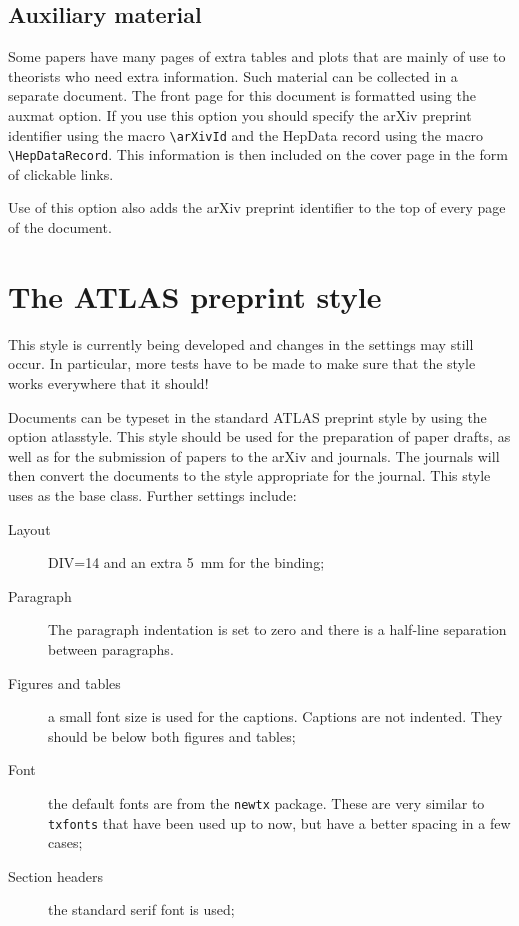 \documentclass[atlasstyle,UKenglish]{latex/atlasdoc}
\newcommand{\Macro}[1]{\texttt{\textbackslash #1}\xspace}
\newcommand{\Option}[1]{\textsf{#1}\xspace}
\newcommand{\Package}[1]{\texttt{#1}\xspace}
\begin{document}
\subsection{Auxiliary material}
\label{sec:auxmat}

Some papers have many pages of extra tables and plots that are mainly of use to theorists
who need extra information.
Such material can be collected in a separate document.
The front page for this document is formatted using the \Option{auxmat} option.
If you use this option you should specify the arXiv preprint identifier
using the macro \Macro{arXivId} and the HepData record using the macro
\Macro{HepDataRecord}.
This information is then included on the cover page in the form of clickable links.

Use of this option also adds the arXiv preprint identifier to the top of every page
of the document.


\section{The ATLAS preprint style}
\label{sec:atlasstyle}

This style is currently being developed and changes in the settings may still occur.
In particular, more tests have to be made to make sure that the style
works everywhere that it should!

Documents can be typeset in the standard ATLAS preprint style by using the option
\Option{atlasstyle}.
This style should be used for the preparation of paper drafts,
as well as for the submission of papers to the arXiv and journals.
The journals will then convert the documents to the style appropriate for the journal.
This style uses \KOMAScript as the base class.
Further settings include:
\begin{description}
\item[Layout] \Option{DIV=14} and an extra \SI{5}{\mm} for the binding;
\item[Paragraph] The paragraph indentation is set to zero and 
  there is a half-line separation between paragraphs.
\item[Figures and tables] a small font size is used for the captions.
  Captions are not indented.
  They should be below both figures and tables;
\item[Font] the default fonts are from the \Package{newtx} package.
  These are very similar to \Package{txfonts} that have been used up to now,
  but have a better spacing in a few cases;
\item[Section headers] the standard serif font is used;
\end{description}
\end{document}
